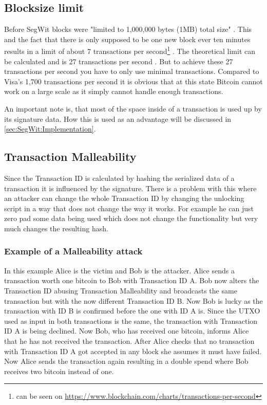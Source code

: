 \subsection{Blocksize limit}
\label{sec:Basics:BlocksizeLimit}
Before SegWit blocks were "limited to 1,000,000 bytes (1MB) total size" \cite{bip-141}. This and the fact that there is only supposed to be one new block ever ten minutes \cite{nakamoto} results in a limit of about 7 transactions per second\footnote{can be seen on \url{https://www.blockchain.com/charts/transactions-per-second}} \cite{hackernoon}.
The theoretical limit can be calculated and is 27 transactions per second \cite{transaction_limit}. But to achieve these 27 transactions per second you have to only use minimal transactions.
Compared to Visa's 1,700 transactions per second \cite{hackernoon} it is obvious that at this state Bitcoin cannot work on a large scale as it simply cannot handle enough transactions.

An important note is, that most of the space inside of a transaction is used up by its signature data. How this is used as an advantage will be discussed in \autoref{sec:SegWit:Implementation}.



\subsection{Transaction Malleability}
\label{sec:Basics:TransactionMalleability}
Since the Transaction ID is calculated by hashing the serialized data of a transaction it is influenced by the signature. There is a problem with this where an attacker can change the whole Transaction ID by changing the unlocking script in a way that does not change the way it works. For example he can just zero pad some data being used which does not change the functionality but very much changes the resulting hash.

\subsubsection{Example of a Malleability attack}
\label{subsec:Basics:TransactionMalleability:Attack}
In this example Alice is the victim and Bob is the attacker.
Alice sends a transaction worth one bitcoin to Bob with Transaction ID A.
Bob now alters the Transaction ID abusing Transaction Malleability and broadcasts the same transaction but with the now different Transaction ID B.
Now Bob is lucky as the transaction with ID B is confirmed before the one with ID A is. Since the UTXO used as input in both transactions is the same, the transaction with Transaction ID A is being declined.
Now Bob, who has received one bitcoin, informs Alice that he has not received the transaction. After Alice checks that no transaction with Transaction ID A got accepted in any block she assumes it must have failed.
Now Alice sends the transaction again resulting in a double spend where Bob receives two bitcoin instead of one.

